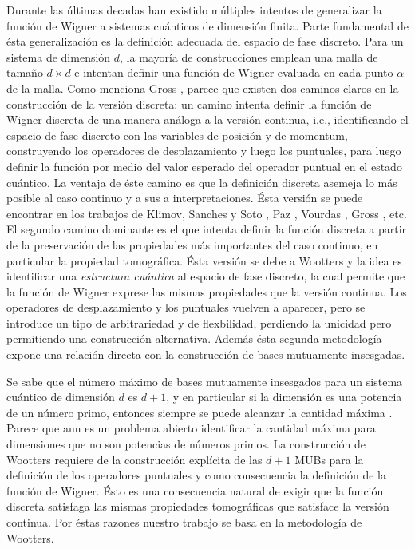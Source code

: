 \documentclass[a4paper]{report}
\begin{document}
  Durante las últimas decadas han existido múltiples
  intentos de generalizar la función de Wigner a sistemas
  cuánticos de dimensión finita. Parte fundamental de ésta
  generalización es la definición adecuada del espacio de
  fase discreto. Para un sistema de dimensión $d$, la
  mayoría de construcciones emplean una malla de tamaño $d
  \times d$ e intentan definir una función de Wigner
  evaluada en cada punto $\alpha$ de la malla. Como menciona
  Gross \cite{gross2005}, parece que existen dos caminos
  claros en la construcción de la versión discreta: un
  camino intenta definir la función de Wigner discreta de
  una manera análoga a la versión continua, i.e.,
  identificando el espacio de fase discreto con las
  variables de posición y de momentum, construyendo los
  operadores de desplazamiento y luego los puntuales, para
  luego definir la función por medio del valor esperado del
  operador puntual en el estado cuántico. La ventaja de éste
  camino es que la definición discreta asemeja lo más
  posible al caso continuo y a sus a interpretaciones. Ésta
  versión se puede encontrar en los trabajos de Klimov,
  Sanches y Soto \cite{klimov2005}, Paz \cite{paz}, Vourdas
  \cite{vourdas2005}, Gross \cite{gross2005}, etc. El
  segundo camino dominante es el que intenta definir la
  función discreta a partir de la preservación de las
  propiedades más importantes del caso continuo, en
  particular la propiedad tomográfica. Ésta versión se debe
  a Wootters \cite{gibbons2004} y la idea es identificar una
  \textit{estructura cuántica} al espacio de fase discreto,
  la cual permite que la función de Wigner exprese las
  mismas propiedades que la versión continua.  Los
  operadores de desplazamiento y los puntuales vuelven a
  aparecer, pero se introduce un tipo de arbitrariedad y de
  flexbilidad, perdiendo la unicidad pero permitiendo una
  construcción alternativa. Además ésta segunda metodología
  expone una relación directa con la construcción de bases
  mutuamente insesgadas.

  Se sabe que el número máximo de bases mutuamente
  insesgados para un sistema cuántico de dimensión $d$ es
  $d+1$, y en particular si la dimensión es una potencia de
  un número primo, entonces siempre se puede alcanzar la
  cantidad máxima \cite{gibbons2004}. Parece que aun es un
  problema abierto identificar la cantidad máxima para
  dimensiones que no son potencias de números primos. La
  construcción de Wootters requiere de la construcción
  explícita de las $d+1$ MUBs para la definición de los
  operadores puntuales y como consecuencia la definición de
  la función de Wigner. Ésto es una consecuencia natural de
  exigir que la función discreta satisfaga las mismas
  propiedades tomográficas que satisface la versión
  continua. Por éstas razones nuestro trabajo se basa en la
  metodología de Wootters.
\end{document}
